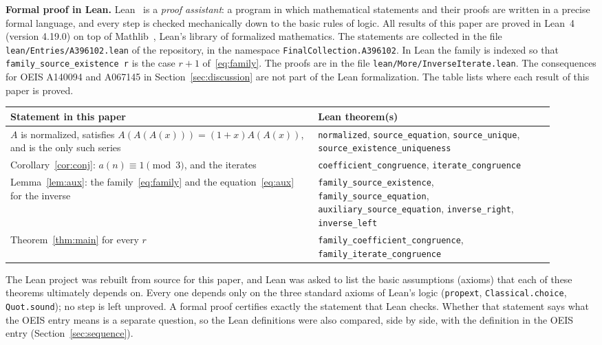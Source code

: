 \documentclass[11pt,a4paper]{article}
\theoremstyle{definition}
\theoremstyle{remark}
\newcommand{\para}[1]{\par\medskip\noindent\textbf{#1}\enspace}
\begin{document}
\para{Formal proof in Lean.}
Lean~\cite{lean} is a \emph{proof assistant}: a program in which mathematical statements and their proofs are written
in a precise formal language, and every step is checked mechanically down to the basic rules of logic. All results of
this paper are proved in Lean~4 (version 4.19.0) on top of Mathlib~\cite{mathlib}, Lean's library of formalized
mathematics. The statements are collected in the file \texttt{lean/Entries/A396102.lean} of the repository,
in the namespace \texttt{FinalCollection.A396102}. In Lean the family is indexed so that \texttt{family\_source\_existence r} is the case $r+1$ of~\eqref{eq:family}. The proofs are in the file \texttt{lean/More/InverseIterate.lean}. The consequences for OEIS A140094 and A067145 in Section~\ref{sec:discussion} are not part of the Lean formalization.
The table lists where each result of this paper is proved.
\begin{center}\small\renewcommand{\arraystretch}{1.25}
\begin{tabular}{>{\raggedright\arraybackslash}p{0.52\linewidth}>{\raggedright\arraybackslash}p{0.4\linewidth}}
\toprule
Statement in this paper & Lean theorem(s)\\
\midrule
$A$ is normalized, satisfies $A(A(A(x)))=(1+x)A(A(x))$, and is the only such series & \texttt{normalized}, \texttt{source\_\allowbreak{}equation}, \texttt{source\_\allowbreak{}unique}, \texttt{source\_\allowbreak{}existence\_\allowbreak{}uniqueness} \\
Corollary~\ref{cor:conj}: $a(n)\equiv1\pmod3$, and the iterates & \texttt{coefficient\_\allowbreak{}congruence}, \texttt{iterate\_\allowbreak{}congruence} \\
Lemma~\ref{lem:aux}: the family~\eqref{eq:family} and the equation~\eqref{eq:aux} for the inverse & \texttt{family\_\allowbreak{}source\_\allowbreak{}existence}, \texttt{family\_\allowbreak{}source\_\allowbreak{}equation}, \texttt{auxiliary\_\allowbreak{}source\_\allowbreak{}equation}, \texttt{inverse\_\allowbreak{}right}, \texttt{inverse\_\allowbreak{}left} \\
Theorem~\ref{thm:main} for every $r$ & \texttt{family\_\allowbreak{}coefficient\_\allowbreak{}congruence}, \texttt{family\_\allowbreak{}iterate\_\allowbreak{}congruence} \\
\bottomrule
\end{tabular}
\end{center}
The Lean project was rebuilt from source for this paper, and Lean was asked to list the basic assumptions (axioms)
that each of these theorems ultimately depends on. Every one depends only on the three standard axioms of Lean's logic
(\texttt{propext}, \texttt{Classical.choice}, \texttt{Quot.sound}); no step is left unproved. A formal proof certifies
exactly the statement that Lean checks. Whether that statement says what the OEIS entry means is a separate question,
so the Lean definitions were also compared, side by side, with the definition in the OEIS entry
(Section~\ref{sec:sequence}).
\end{document}
